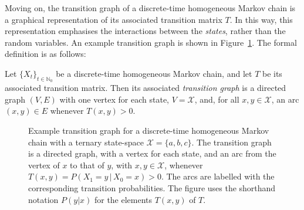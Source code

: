 \documentclass[graybox]{svmult}
\newcommand{\nats}{\mathbb{N}}
\newcommand{\natswith}{\nats_{0}}
\newcommand{\states}{\mathcal{X}}
\begin{document}
Moving on, the transition graph of a discrete-time homogeneous Markov chain is a graphical representation of its associated transition matrix $T$. In this way, this representation emphasises the interactions between the \emph{states}, rather than the random variables. An example transition graph is shown in Figure~\ref{fig:example_trans_graph}. The formal definition is as follows:
\begin{definition}\label{def:trans_graph}
Let $\{X_t\}_{t\in\natswith}$ be a discrete-time homogeneous Markov chain, and let $T$ be its associated transition matrix. Then its associated \emph{transition graph} is a directed graph $(V,E)$ with one vertex for each state, $V=\states$, and, for all $x,y\in\states$, an arc $(x,y)\in E$ whenever $T(x,y)>0$.
\end{definition}
\begin{figure}
\centering
{}
\caption{Example transition graph for a discrete-time homogeneous Markov chain with a ternary state-space $\states=\{a,b,c\}$. The transition graph is a directed graph, with a vertex for each state, and an arc from the vertex of $x$ to that of $y$, with $x,y\in\states$, whenever $T(x,y)=P(X_1=y\,\vert\,X_0=x)>0$. The arcs are labelled with the corresponding transition probabilities. The figure uses the shorthand notation $P(y\vert x)$ for the elements $T(x,y)$ of $T$.}
\label{fig:example_trans_graph}
\end{figure}
\end{document}
